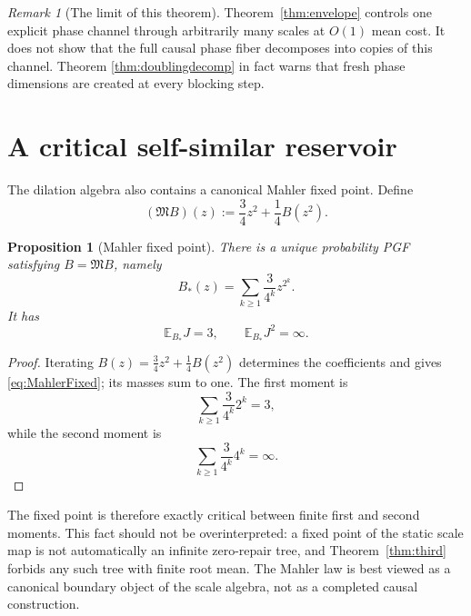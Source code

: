 \documentclass[11pt,a4paper]{article}
\newtheorem{proposition}[theorem]{Proposition}
\theoremstyle{definition}
\theoremstyle{remark}
\newtheorem{remark}[theorem]{Remark}
\newcommand{\E}{\mathbb E}
\begin{document}
\begin{remark}[The limit of this theorem]
Theorem~\ref{thm:envelope} controls one explicit phase channel through
arbitrarily many scales at \(O(1)\) mean cost.  It does not show that the full
causal phase fiber decomposes into copies of this channel.  Theorem
\ref{thm:doublingdecomp} in fact warns that fresh phase dimensions are created
at every blocking step.
\end{remark}

\section{A critical self-similar reservoir}
\label{sec:mahler}

The dilation algebra also contains a canonical Mahler fixed point.  Define
\begin{equation}
 (\mathfrak M B)(z):=\frac34z^2+\frac14B(z^2).
 \label{eq:MahlerMap}
\end{equation}

\begin{proposition}[Mahler fixed point]
There is a unique probability PGF satisfying \(B=\mathfrak M B\), namely
\begin{equation}
 \boxed{
 B_*(z)=\sum_{k\ge1}\frac3{4^k}z^{2^k}.
 }
 \label{eq:MahlerFixed}
\end{equation}
It has
\begin{equation}
 \E_{B_*}J=3,
 \qquad
 \E_{B_*}J^2=\infty.
 \label{eq:MahlerMoments}
\end{equation}
\end{proposition}

\begin{proof}
Iterating \(B(z)=\frac34z^2+\frac14B(z^2)\) determines the coefficients and
gives \eqref{eq:MahlerFixed}; its masses sum to one.  The first moment is
\[
 \sum_{k\ge1}\frac3{4^k}2^k=3,
\]
while the second moment is
\[
 \sum_{k\ge1}\frac3{4^k}4^k=\infty.
\]
\end{proof}

The fixed point is therefore exactly critical between finite first and second
moments.  This fact should not be overinterpreted: a fixed point of the static
scale map is not automatically an infinite zero-repair tree, and
Theorem~\ref{thm:third} forbids any such tree with finite root mean.  The
Mahler law is best viewed as a canonical boundary object of the scale algebra,
not as a completed causal construction.

\end{document}
